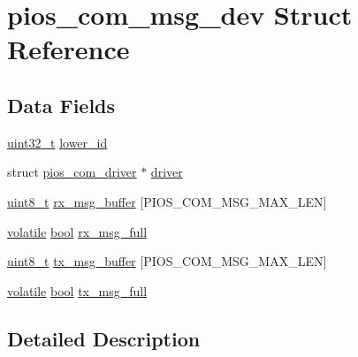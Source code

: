 \hypertarget{structpios__com__msg__dev}{\section{pios\-\_\-com\-\_\-msg\-\_\-dev Struct Reference}
\label{structpios__com__msg__dev}
}
\subsection*{Data Fields}
\begin{DoxyCompactItemize}
\item 
\hyperlink{stdint_8h_a435d1572bf3f880d55459d9805097f62}{uint32\-\_\-t} \hyperlink{structpios__com__msg__dev_a08cc90d0b7c8cd94cd589c948234869b}{lower\-\_\-id}
\item 
struct \hyperlink{structpios__com__driver}{pios\-\_\-com\-\_\-driver} $\ast$ \hyperlink{structpios__com__msg__dev_a776368775bf0a23a210d33ce79a0f620}{driver}
\item 
\hyperlink{stdint_8h_aba7bc1797add20fe3efdf37ced1182c5}{uint8\-\_\-t} \hyperlink{structpios__com__msg__dev_ab1901ce323a85aa3e31dc1b965b0ce01}{rx\-\_\-msg\-\_\-buffer} \mbox{[}P\-I\-O\-S\-\_\-\-C\-O\-M\-\_\-\-M\-S\-G\-\_\-\-M\-A\-X\-\_\-\-L\-E\-N\mbox{]}
\item 
\hyperlink{group___c_m_s_i_s___core___instruction_interface_gad7d93af13046b0378601b85c8c16673b}{volatile} \hyperlink{group___exported__types_gaf6a258d8f3ee5206d682d799316314b1}{bool} \hyperlink{structpios__com__msg__dev_a38043f348bd99edfb297de34bda052e4}{rx\-\_\-msg\-\_\-full}
\item 
\hyperlink{stdint_8h_aba7bc1797add20fe3efdf37ced1182c5}{uint8\-\_\-t} \hyperlink{structpios__com__msg__dev_a7155e93159cd5cfcd394884b8ceaa78b}{tx\-\_\-msg\-\_\-buffer} \mbox{[}P\-I\-O\-S\-\_\-\-C\-O\-M\-\_\-\-M\-S\-G\-\_\-\-M\-A\-X\-\_\-\-L\-E\-N\mbox{]}
\item 
\hyperlink{group___c_m_s_i_s___core___instruction_interface_gad7d93af13046b0378601b85c8c16673b}{volatile} \hyperlink{group___exported__types_gaf6a258d8f3ee5206d682d799316314b1}{bool} \hyperlink{structpios__com__msg__dev_acfd2f035cc532f5f6869277283be397b}{tx\-\_\-msg\-\_\-full}
\end{DoxyCompactItemize}


\subsection{Detailed Description}


